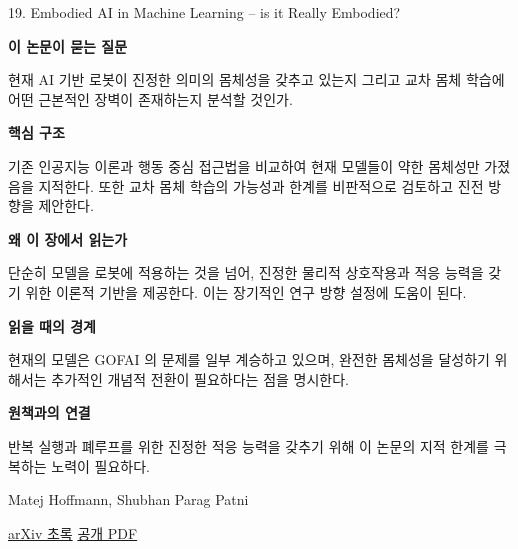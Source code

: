 \documentclass[11pt,openany]{book}
\begin{document}
\begin{termcard}{19. Embodied AI in Machine Learning -- is it Really Embodied?}

\par

\medskip

{\sffamily\bfseries\color{deepblue} 이 논문이 묻는 질문}\par

현재 AI 기반 로봇이 진정한 의미의 몸체성을 갖추고 있는지 그리고 교차 몸체 학습에 어떤 근본적인 장벽이 존재하는지 분석할 것인가.

\smallskip

{\sffamily\bfseries\color{deepblue} 핵심 구조}\par

기존 인공지능 이론과 행동 중심 접근법을 비교하여 현재 모델들이 약한 몸체성만 가졌음을 지적한다. 또한 교차 몸체 학습의 가능성과 한계를 비판적으로 검토하고 진전 방향을 제안한다.

\smallskip

{\sffamily\bfseries\color{deepblue} 왜 이 장에서 읽는가}\par

단순히 모델을 로봇에 적용하는 것을 넘어, 진정한 물리적 상호작용과 적응 능력을 갖기 위한 이론적 기반을 제공한다. 이는 장기적인 연구 방향 설정에 도움이 된다.

\smallskip

{\sffamily\bfseries\color{coral} 읽을 때의 경계}\par

현재의 모델은 GOFAI 의 문제를 일부 계승하고 있으며, 완전한 몸체성을 달성하기 위해서는 추가적인 개념적 전환이 필요하다는 점을 명시한다.

\smallskip

{\sffamily\bfseries\color{teal} 원책과의 연결}\par

반복 실행과 폐루프를 위한 진정한 적응 능력을 갖추기 위해 이 논문의 지적 한계를 극복하는 노력이 필요하다.

\medskip

{\footnotesize\color{muted} Matej Hoffmann, Shubhan Parag Patni\par

\href{https://arxiv.org/abs/2505.10705}{arXiv 초록} \quad \href{https://arxiv.org/pdf/2505.10705}{공개 PDF}\par}

\end{termcard}
\end{document}
